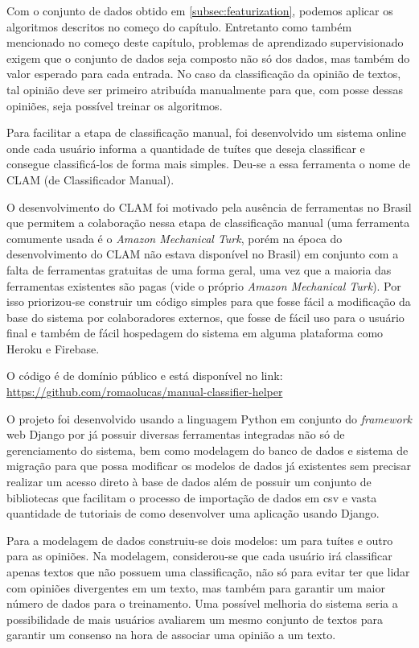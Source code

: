 Com o conjunto de dados obtido em \ref{subsec:featurization}, podemos aplicar os algoritmos 
descritos no começo do capítulo. Entretanto como também mencionado no começo deste capítulo,
problemas de aprendizado supervisionado exigem que o conjunto de dados seja composto não só dos
dados, mas também do valor esperado para cada entrada. No caso da classificação da opinião de
textos, tal opinião deve ser primeiro atribuída manualmente para que, com posse dessas opiniões,
seja possível treinar os algoritmos.

Para facilitar a etapa de classificação manual, foi desenvolvido um sistema online onde cada usuário
informa a quantidade de tuítes que deseja classificar e consegue classificá-los de forma
mais simples. Deu-se a essa ferramenta o nome de CLAM (de Classificador Manual).

O desenvolvimento do CLAM foi motivado pela ausência de ferramentas no Brasil que permitem a
colaboração nessa etapa de classificação manual (uma ferramenta comumente usada é o \textit{Amazon
Mechanical Turk}, porém na época do desenvolvimento do CLAM não estava disponível no Brasil)
em conjunto com a falta de ferramentas gratuitas de 
uma forma geral, uma vez que a maioria das ferramentas existentes são pagas (vide o 
próprio \textit{Amazon Mechanical Turk}). Por isso priorizou-se construir um código simples
para que fosse fácil a modificação da base do sistema por colaboradores externos,
que fosse de fácil uso para o usuário final e também de fácil hospedagem do sistema
em alguma plataforma como Heroku e Firebase.

O código é de domínio público e está disponível no link:
 \url{https://github.com/romaolucas/manual-classifier-helper}

O projeto foi desenvolvido usando a linguagem Python em conjunto do \textit{framework} web
Django por já possuir diversas ferramentas integradas não só de gerenciamento do sistema, bem como
modelagem do banco de dados e sistema de migração para que possa modificar os modelos de dados já
existentes sem precisar realizar um acesso direto à base de dados além de possuir um conjunto
de bibliotecas que facilitam o processo de importação de dados em csv e vasta quantidade de 
tutoriais de como desenvolver uma aplicação usando Django.

Para a modelagem de dados construiu-se dois modelos: um para tuítes e outro para
as opiniões.
Na modelagem, considerou-se que cada usuário irá classificar apenas textos que não 
possuem uma classificação, não só para evitar ter que lidar com opiniões divergentes em um texto,
mas também para garantir um maior número de dados para o treinamento. Uma possível melhoria
do sistema seria a possibilidade de mais usuários avaliarem um mesmo conjunto de textos para
garantir um consenso na hora de associar uma opinião a um texto.

